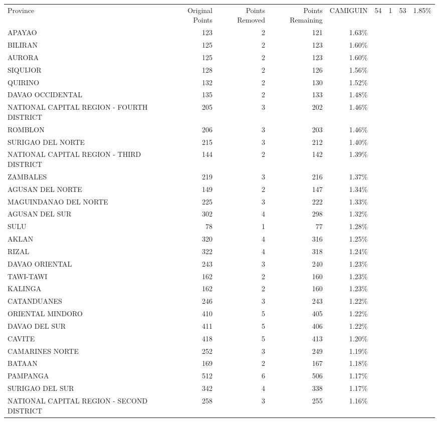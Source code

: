 \begin{tabular}{lrrrr}
\toprule
Province & Original Points & Points Removed & Points Remaining & %
\midrule
CAMIGUIN & 54 & 1 & 53 & 1.85\% \\
APAYAO & 123 & 2 & 121 & 1.63\% \\
BILIRAN & 125 & 2 & 123 & 1.60\% \\
AURORA & 125 & 2 & 123 & 1.60\% \\
SIQUIJOR & 128 & 2 & 126 & 1.56\% \\
QUIRINO & 132 & 2 & 130 & 1.52\% \\
DAVAO OCCIDENTAL & 135 & 2 & 133 & 1.48\% \\
NATIONAL CAPITAL REGION - FOURTH DISTRICT & 205 & 3 & 202 & 1.46\% \\
ROMBLON & 206 & 3 & 203 & 1.46\% \\
SURIGAO DEL NORTE & 215 & 3 & 212 & 1.40\% \\
NATIONAL CAPITAL REGION - THIRD DISTRICT & 144 & 2 & 142 & 1.39\% \\
ZAMBALES & 219 & 3 & 216 & 1.37\% \\
AGUSAN DEL NORTE & 149 & 2 & 147 & 1.34\% \\
MAGUINDANAO DEL NORTE & 225 & 3 & 222 & 1.33\% \\
AGUSAN DEL SUR & 302 & 4 & 298 & 1.32\% \\
SULU & 78 & 1 & 77 & 1.28\% \\
AKLAN & 320 & 4 & 316 & 1.25\% \\
RIZAL & 322 & 4 & 318 & 1.24\% \\
DAVAO ORIENTAL & 243 & 3 & 240 & 1.23\% \\
TAWI-TAWI & 162 & 2 & 160 & 1.23\% \\
KALINGA & 162 & 2 & 160 & 1.23\% \\
CATANDUANES & 246 & 3 & 243 & 1.22\% \\
ORIENTAL MINDORO & 410 & 5 & 405 & 1.22\% \\
DAVAO DEL SUR & 411 & 5 & 406 & 1.22\% \\
CAVITE & 418 & 5 & 413 & 1.20\% \\
CAMARINES NORTE & 252 & 3 & 249 & 1.19\% \\
BATAAN & 169 & 2 & 167 & 1.18\% \\
PAMPANGA & 512 & 6 & 506 & 1.17\% \\
SURIGAO DEL SUR & 342 & 4 & 338 & 1.17\% \\
NATIONAL CAPITAL REGION - SECOND DISTRICT & 258 & 3 & 255 & 1.16\% \\

\end{tabular}

